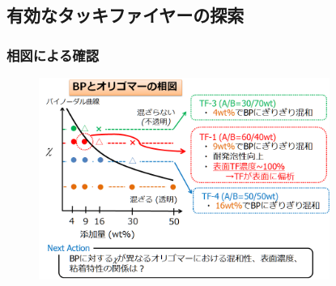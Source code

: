 \documentclass[12pt, dvipdfmx]{beamer}
\begin{document}
\subsection{有効なタッキファイヤーの探索}
\begin{frame}\frametitle{相図による確認}

	\begin{figure}
		\begin{center}
			\includegraphics[width=95mm]{tennkaryou_2.png}
		\end{center}
	\end{figure}
	\end{frame}
\end{document}
